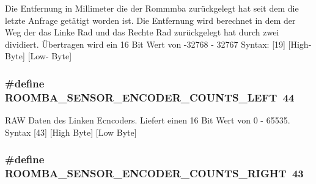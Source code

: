 Die Entfernung in Millimeter die der Rommmba zurückgelegt hat seit dem die letzte Anfrage getätigt worden ist. Die Entfernung wird berechnet in dem der Weg der das Linke Rad und das Rechte Rad zurückgelegt hat durch zwei dividiert. Übertragen wird ein 16 Bit Wert von -\/32768 -\/ 32767 Syntax\-: \mbox{[}19\mbox{]} \mbox{[}High-\/ Byte\mbox{]} \mbox{[}Low-\/ Byte\mbox{]} \hypertarget{group__roomba__sensor__extern_ga215bbf96794fd028ac7e389ec8b7c369}{
\subsubsection[{R\-O\-O\-M\-B\-A\-\_\-\-S\-E\-N\-S\-O\-R\-\_\-\-E\-N\-C\-O\-D\-E\-R\-\_\-\-C\-O\-U\-N\-T\-S\-\_\-\-L\-E\-F\-T}]{\setlength{\rightskip}{0pt plus 5cm}\#define R\-O\-O\-M\-B\-A\-\_\-\-S\-E\-N\-S\-O\-R\-\_\-\-E\-N\-C\-O\-D\-E\-R\-\_\-\-C\-O\-U\-N\-T\-S\-\_\-\-L\-E\-F\-T~44}}\label{group__roomba__sensor__extern_ga215bbf96794fd028ac7e389ec8b7c369}
R\-A\-W Daten des Linken Ecncoders. Liefert einen 16 Bit Wert von 0 -\/ 65535. Syntax \mbox{[}43\mbox{]} \mbox{[}High Byte\mbox{]} \mbox{[}Low Byte\mbox{]} \hypertarget{group__roomba__sensor__extern_gaec90dd94f95bc7cc663ca52c9a3e8371}{
\subsubsection[{R\-O\-O\-M\-B\-A\-\_\-\-S\-E\-N\-S\-O\-R\-\_\-\-E\-N\-C\-O\-D\-E\-R\-\_\-\-C\-O\-U\-N\-T\-S\-\_\-\-R\-I\-G\-H\-T}]{\setlength{\rightskip}{0pt plus 5cm}\#define R\-O\-O\-M\-B\-A\-\_\-\-S\-E\-N\-S\-O\-R\-\_\-\-E\-N\-C\-O\-D\-E\-R\-\_\-\-C\-O\-U\-N\-T\-S\-\_\-\-R\-I\-G\-H\-T~43}}\label{group__roomba__sensor__extern_gaec90dd94f95bc7cc663ca52c9a3e8371}
